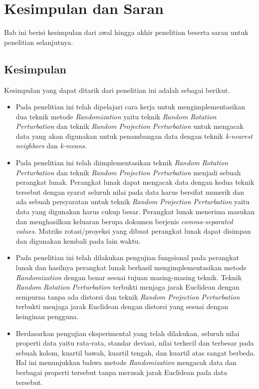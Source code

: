 \chapter{Kesimpulan dan Saran}
\label{chap:kesimpulan-saran}

Bab ini berisi kesimpulan dari awal hingga akhir penelitian beserta saran untuk penelitian selanjutnya.

\section{Kesimpulan}
\label{sec:kesimpulan}

Kesimpulan yang dapat ditarik dari penelitian ini adalah sebagai berikut.
\begin{itemize}
    \item Pada penelitian ini telah dipelajari cara kerja untuk mengimplementasikan dua teknik metode \textit{Randomization} yaitu teknik \textit{Random Rotation Perturbation} dan teknik \textit{Random Projection Perturbation} untuk mengacak data yang akan digunakan untuk penambangan data dengan teknik \textit{k-nearest neighbors} dan \textit{k-means}.
    \item Pada penelitian ini telah diimplementasikan teknik \textit{Random Rotation Perturbation} dan teknik \textit{Random Projection Perturbation} menjadi sebuah perangkat lunak. Perangkat lunak dapat mengacak data dengan kedua teknik tersebut dengan syarat seluruh nilai pada data harus bersifat numerik dan ada sebuah persyaratan untuk teknik \textit{Random Projection Perturbation} yaitu data yang digunakan harus cukup besar. Perangkat lunak menerima masukan dan menghasilkan keluaran berupa dokumen berjenis \textit{comma-separated values}. Matriks rotasi/proyeksi yang dibuat perangkat lunak dapat disimpan dan digunakan kembali pada lain waktu.
    \item Pada penelitian ini telah dilakukan pengujian fungsional pada perangkat lunak dan hasilnya perangkat lunak berhasil mengimplementasikan metode \textit{Randomization} dengan benar sesuai tujuan masing-masing teknik. Teknik \textit{Random Rotation Perturbation} terbukti menjaga jarak Euclidean dengan sempurna tanpa ada distorsi dan teknik \textit{Random Projection Perturbation} terbukti menjaga jarak Euclidean dengan distorsi yang sesuai dengan keinginan pengguna.
    \item Berdasarkan pengujian eksperimental yang telah dilakukan, seluruh nilai properti data yaitu rata-rata, standar deviasi, nilai terkecil dan terbesar pada sebuah kolom, kuartil bawah, kuartil tengah, dan kuartil atas sangat berbeda. Hal ini menunjukkan bahwa metode \textit{Randomization} mengacak data dan berbagai properti tersebut tanpa merusak jarak Euclidean pada data tersebut.

\end{itemize}

